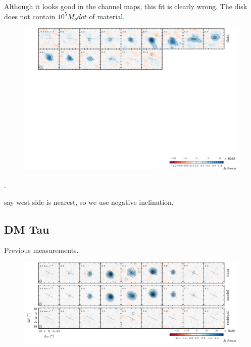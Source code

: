 \documentclass[twocolumn]{aastex6}
\begin{document}
Although it looks good in the channel maps, this fit is clearly wrong. The disk does not contain $10^5 M_odot$ of material.

\begin{figure}[htb]
\begin{center}
  \includegraphics{UXTauA.pdf}
  \end{center}
\end{figure}

\citep{espaillat07}.

\citet{tanii12} say west side is nearest, so we use negative inclination.


\subsection{DM Tau}
Previous measurements.

\begin{figure}[htb]
\begin{center}
  \includegraphics{DMTau.pdf}
  \end{center}
\end{figure}
\end{document}
